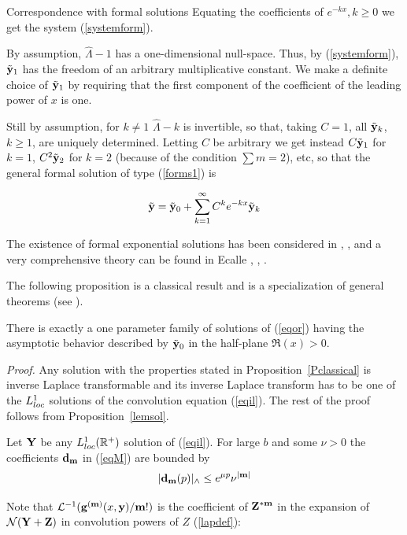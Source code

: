 \documentclass[12pt]{article}
\begin{document}
\begin{subsection}{Correspondence with formal solutions}
\z Equating the coefficients of $e^{-kx},
k\ge 0$ we get the system (\ref{systemform}).



By assumption, $\hat\Lambda-1$ has a one-dimensional null-space. Thus, by
(\ref{systemform}),  $\tilde{{\bf y}}_1$ has the freedom of an arbitrary
multiplicative constant. We make a definite choice of $\tilde{{\bf y}}_1$ by
requiring that the first component of the coefficient of the leading
power of $x$ is one.

Still by assumption, for $k\ne 1$ 
$\hat\Lambda-k$ is
invertible, so that, taking $C=1$,
all $\tilde{{\bf y}}_{k}$, $k\ge 1$,  are uniquely determined.
Letting $C$ be arbitrary
we get instead  $C\tilde{{\bf y}}_1$ for $k=1$, 
 $C^2\tilde{{\bf y}}_2$ for $k=2$ (because of the condition $\sum m=2$),
etc, so that the general formal
solution of type (\ref{forms1}) is 

$$\tilde{{\bf y}}=\tilde{{\bf y}}_0+\sum_{k=1}^\infty C^ke^{-kx}\tilde{{\bf y}}_{k}$$ 



The existence of formal exponential solutions
has been considered in \cite{Fabry},
\cite{Cope}, \cite{Iwano} and a very comprehensive
theory can be found in Ecalle   \cite{Ecalle-book}, 
\cite{Ecalle}, \cite{Ecalle2}.




The following proposition is a classical result
and is a specialization
of general theorems (see \cite{Iwano}).

 There is exactly a one parameter family of solutions of (\ref{eqor})
having the asymptotic behavior described by 
$\tilde{{\bf y}}_0$ in the half-plane $\Re(x)>0$.

\ePp



{\em Proof.}  Any solution
with the properties stated in Proposition~\ref{Pclassical} is inverse Laplace
transformable and its inverse Laplace transform has to be one of the
${L}^1_{loc}$ solutions of the convolution equation (\ref{eqil}).
The rest of the proof follows from Proposition~\ref{lemsol}.

\Box




 Let ${\bf Y}$ be any ${L}^1_{loc}(\mathbb{R}^+)$ solution of (\ref{eqil}).
 For large $b$ and some $\nu>0$ the coefficients
${\bf d_m}$  in (\ref{eqM}) are bounded by
$$|{\bf d_m}(p)|_\wedge\le e^{\mu p}\nu^{|{\bf m}|}$$
\ePp

Note that ${\cal L}^{-1} ({\bf g}^{({\bf m})}(x,{\bf y})/
{\bf m} !)$
is the coefficient of ${\bf Z}^{*{\bf m}}$ in the expansion of
${{\cal N}}({\bf Y}+{\bf Z})$ in convolution powers of $Z$  (\ref{lapdef}):


\end{subsection}
\end{document}
